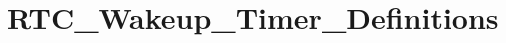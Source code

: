 \hypertarget{group___r_t_c___wakeup___timer___definitions}{\section{R\-T\-C\-\_\-\-Wakeup\-\_\-\-Timer\-\_\-\-Definitions}
\label{group___r_t_c___wakeup___timer___definitions}
}
